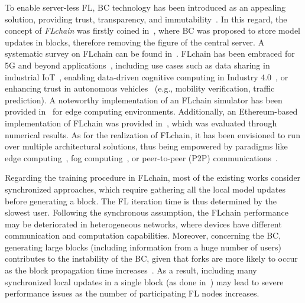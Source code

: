 \documentclass[10pt,journal,compsoc]{IEEEtran}
\begin{document}
To enable server-less FL, BC technology has been introduced as an appealing solution, providing trust, transparency, and immutability~\cite{liu2020secure, al2021edge}. In this regard, the concept of \textit{FLchain} was firstly coined in~\cite{majeed2019flchain, bao2019flchain}, where BC was proposed to store model updates in blocks, therefore removing the figure of the central server. A systematic survey on FLchain can be found in~\cite{hou2021systematic}. FLchain has been embraced for 5G and beyond applications~\cite{lu2020blockchain2}, including use cases such as data sharing in industrial IoT~\cite{lu2019blockchain}, enabling data-driven cognitive computing in Industry 4.0~\cite{qu2020blockchained}, or enhancing trust in autonomous vehicles~\cite{pokhrel2020federated,qi2021privacy} (e.g., mobility verification, traffic prediction). A noteworthy implementation of an FLchain simulator has been provided in~\cite{qu2021chainfl} for edge computing environments. Additionally, an Ethereum-based implementation of FLchain was provided in~\cite{korkmaz2020chain}, which was evaluated through numerical results. As for the realization of FLchain, it has been envisioned to run over multiple architectural solutions, thus being empowered by paradigms like edge computing~\cite{majeed2019flchain}, fog computing~\cite{qu2020decentralized}, or peer-to-peer (P2P) communications~\cite{kim2019blockchained, ma2020federated}. 


Regarding the training procedure in FLchain, most of the existing works consider synchronized approaches, which require gathering all the local model updates before generating a block. The FL iteration time is thus determined by the slowest user. Following the synchronous assumption, the FLchain performance may be deteriorated in heterogeneous networks, where devices have different communication and computation capabilities. Moreover, concerning the BC, generating large blocks (including information from a huge number of users) contributes to the instability of the BC, given that forks are more likely to occur as the block propagation time increases~\cite{wilhelmi2021performance}. As a result, including many synchronized local updates in a single block (as done in~\cite{kim2019blockchained,liu2021blockchain}) may lead to severe performance issues as the number of participating FL nodes increases.
\end{document}
